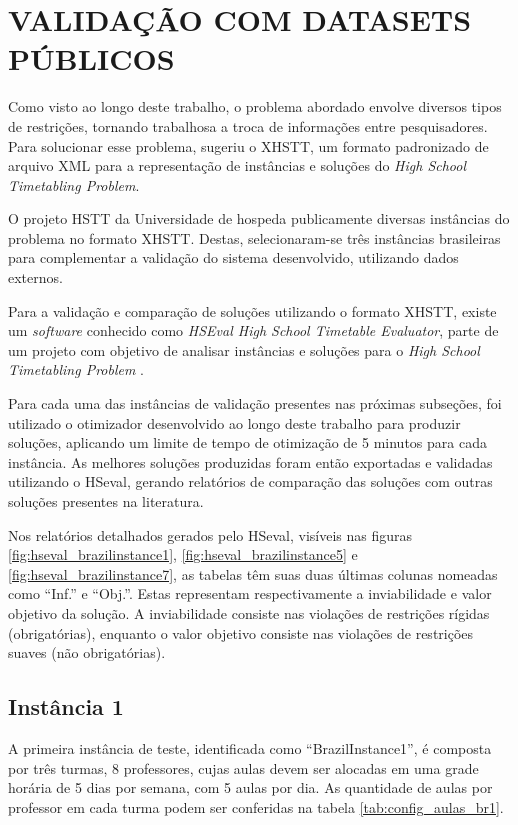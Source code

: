 \section{VALIDAÇÃO COM DATASETS PÚBLICOS}
\label{sec:validacao_datasets}

Como visto ao longo deste trabalho, o problema abordado envolve diversos tipos de restrições, tornando trabalhosa a troca de informações entre pesquisadores. Para solucionar esse problema,  sugeriu o XHSTT, um formato padronizado de arquivo XML para a representação de instâncias e soluções do \textit{High School Timetabling Problem}.

O projeto HSTT da Universidade de  hospeda publicamente diversas instâncias do problema no formato XHSTT. Destas, selecionaram-se três instâncias brasileiras para complementar a validação do sistema desenvolvido, utilizando dados externos.

Para a validação e comparação de soluções utilizando o formato XHSTT, existe um \textit{software} conhecido como \textit{HSEval High School Timetable Evaluator}, parte de um projeto com objetivo de analisar instâncias e soluções para o \textit{High School Timetabling Problem} \cite{HSEval}.

Para cada uma das instâncias de validação presentes nas próximas subseções, foi utilizado o otimizador desenvolvido ao longo deste trabalho para produzir soluções, aplicando um limite de tempo de otimização de 5 minutos para cada instância. As melhores soluções produzidas foram então exportadas e validadas utilizando o HSeval, gerando relatórios de comparação das soluções com outras soluções presentes na literatura.

Nos relatórios detalhados gerados pelo HSeval, visíveis nas figuras \ref{fig:hseval_brazilinstance1}, \ref{fig:hseval_brazilinstance5} e \ref{fig:hseval_brazilinstance7}, as tabelas têm suas duas últimas colunas nomeadas como ``Inf.'' e ``Obj.''. Estas representam respectivamente a inviabilidade e valor objetivo da solução. A inviabilidade consiste nas violações de restrições rígidas (obrigatórias), enquanto o valor objetivo consiste nas violações de restrições suaves (não obrigatórias).

\newpage
\subsection{Instância 1}

A primeira instância de teste, identificada como ``BrazilInstance1'', é composta por três turmas, 8 professores, cujas aulas devem ser alocadas em uma grade horária de 5 dias por semana, com 5 aulas por dia. As quantidade de aulas por professor em cada turma podem ser conferidas na tabela \ref{tab:config_aulas_br1}.

